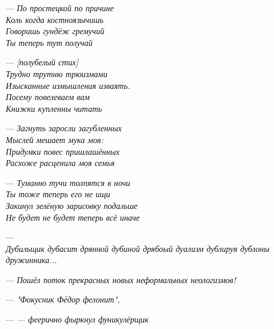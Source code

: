 \begin{itemize}
{Коль когда костноязычно говоришь --- голова гудит}
  \item[---] \emph{По простецкой по причине\\
                  Коль когда костноязычишь\\
                  Говоришь гундёж гремучий\\
                  Ты теперь тут получай}
  \item[---] \emph{[полубелый стих]\\
  Трудно трутню трюизмами\\
Изысканные измышления изваять.\\
Посему повелеваем вам\\
Книжки купленны читать}
  \item[---] \emph{Загнуть заросли загубленных\\
Мыслей мешает мука моя:\\
Придумки повес пришлашённых\\
Расхоже расценила моя семья}
  \item[---] \emph{Туманно тучи толпятся в ночи\\
Ты тоже теперь его не ищи\\
Закинул зелёную зарисовку подальше\\
Не будет не будет теперь всё иначе}\\
\emph{}
  \item[---] \emph{}\\
             \emph{Дубильщик дубасит дрянной дубиной дрябоый дуализм дублируя дублоны дружинника...}
  \item[---] \emph{Пошёл поток прекрасных новых неформальных неологизмов!}
  \item[---] \emph{"Фокусник Фёдор фелонит",}
  \item[---] \emph{--- феерично фыркнул фуникулёрщик}
\end{itemize}

